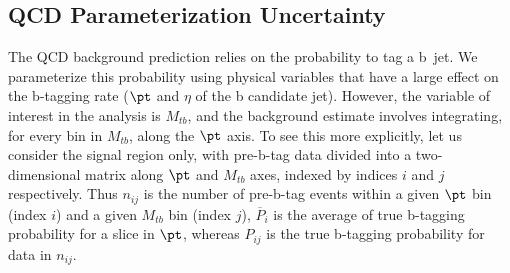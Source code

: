 






\clearpage

\subsection{QCD Parameterization Uncertainty}
\label{sec:qcdpunc}

The QCD background prediction relies on the probability to tag a b~jet.  
We parameterize this probability using physical variables that
have a large effect on the b-tagging rate ($\pt$ and $\eta$ of the b
candidate jet).  However, the variable of interest in the analysis
is $M_{tb}$, and the background estimate involves integrating, for
every bin in $M_{tb}$, along the $\pt$ axis.  To see this more
explicitly, let us consider the signal region only, with pre-b-tag
data divided into a two-dimensional matrix along $\pt$ and
$M_{tb}$ axes, indexed by indices $i$ and $j$ respectively.
Thus $n_{ij}$ is the number of pre-b-tag events within a given $\pt$
bin (index $i$) and a given $M_{tb}$ bin (index $j$), 
$\overline P_i$ is the average of true b-tagging probability for a slice 
in $\pt$, whereas $P_{ij}$ is the true b-tagging probability for
data in $n_{ij}$.

